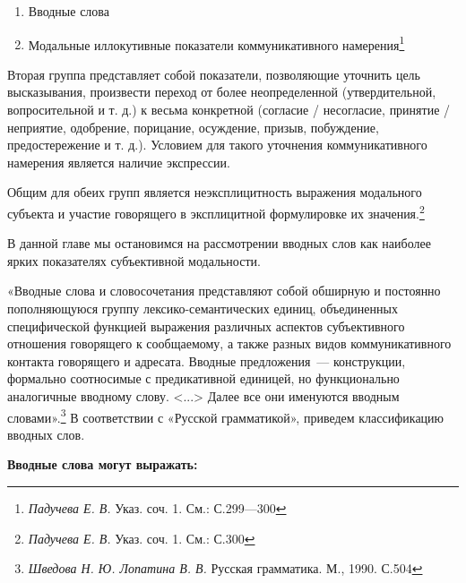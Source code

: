 \documentclass{kursa4}
\begin{document}
      \begin{enumerate}
        \item Вводные слова
        \item Модальные иллокутивные показатели коммуникативного
        намерения\footnote{\textit{{ Падучева Е. В.
        }}{Указ. соч. 1. См.: С.299—300}}
      \end{enumerate}
      Вторая группа представляет собой показатели, позволяющие уточнить цель
      высказывания, произвести переход от более неопределенной
      (утвердительной, вопросительной и т. д.) к весьма конкретной (согласие
      / несогласие, принятие / неприятие, одобрение, порицание, осуждение,
      призыв, побуждение, предостережение и т. д.). Условием для такого
      уточнения коммуникативного намерения является наличие экспрессии. 

      Общим для обеих групп является неэксплицитность выражения модального
      субъекта и участие говорящего в эксплицитной формулировке их
      значения.\footnote{\textit{{ Падучева Е. В.
      }}{Указ. соч. 1. См.: С.300}}

      В данной главе мы остановимся на рассмотрении вводных слов как
      наиболее ярких показателях субъективной модальности.

      «Вводные слова и словосочетания представляют собой обширную и
      постоянно пополняющуюся группу лексико-семантических единиц,
      объединенных специфической функцией выражения различных аспектов
      субъективного отношения говорящего к сообщаемому, а также разных видов
      коммуникативного контакта говорящего и адресата. Вводные предложения~---
      конструкции, формально соотносимые с предикативной единицей, но
      функционально аналогичные вводному слову. \textless{}...\textgreater{}
      Далее все они именуются вводным
      словами».\footnote{\textit{{ Шведова Н. Ю. Лопатина В.
      В. }}{Русская грамматика. М., 1990. С.504}}\newline
      В соответствии с «Русской грамматикой», приведем классификацию
      вводных слов.

      \textbf{Вводные слова могут выражать:}
\end{document}

